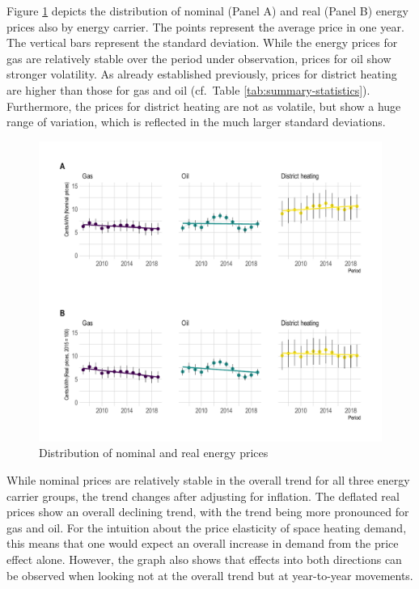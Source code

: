\documentclass[12pt,twoside]{reedthesis}
\begin{document}
Figure \ref{fig:price-descriptive-graph} depicts the distribution of nominal (Panel A) and real (Panel B) energy prices also by energy carrier. The points represent the average price in one year. The vertical bars represent the standard deviation. While the energy prices for gas are relatively stable over the period under observation, prices for oil show stronger volatility. As already established previously, prices for district heating are higher than those for gas and oil (cf.~Table \ref{tab:summary-statistics}). Furthermore, the prices for district heating are not as volatile, but show a huge range of variation, which is reflected in the much larger standard deviations.
\begin{figure}

{\centering \includegraphics[width=1\linewidth]{figure/prices_descriptive} 

}

\caption{Distribution of nominal and real energy prices}\label{fig:price-descriptive-graph}
\end{figure}
While nominal prices are relatively stable in the overall trend for all three energy carrier groups, the trend changes after adjusting for inflation. The deflated real prices show an overall declining trend, with the trend being more pronounced for gas and oil. For the intuition about the price elasticity of space heating demand, this means that one would expect an overall increase in demand from the price effect alone. However, the graph also shows that effects into both directions can be observed when looking not at the overall trend but at year-to-year movements.
\end{document}
